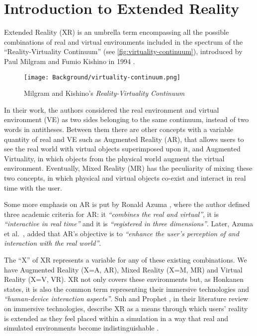\section{Introduction to Extended Reality}
\label{sec:background-intro}

Extended Reality (XR) is an umbrella term encompassing all the possible combinations of real and virtual environments included in the spectrum of the “Reality-Virtuality Continuum” (see \autoref{fig:virtuality-continuum}), introduced by Paul Milgram and Fumio Kishino in 1994 \cite{milgram_taxonomy_1994}.

\begin{figure}[h]
	\centering
	\texttt{[image: Background/virtuality-continuum.png]}
	\caption{Milgram and Kishino's \textit{Reality-Virtuality Continuum}}
	\label{fig:virtuality-continuum}
\end{figure}
In their work, the authors considered the real environment and virtual environment (VE) as two sides belonging to the same continuum, instead of two words in antitheses. Between them there are other concepts with a variable quantity of real and VE such as Augmented Reality (AR), that allows users to see the real world with virtual objects superimposed upon it, and Augmented Virtuality, in which objects from the physical world augment the virtual environment. Eventually, Mixed Reality (MR) has the peculiarity of mixing these two concepts, in which physical and virtual objects co-exist and interact in real time with the user.

Some more emphasis on AR is put by Ronald Azuma \cite{azuma1997survey}, where the author defined three academic criteria for AR: it \textit{“combines the real and virtual”}, it is \textit{“interactive in real time”} and it is \textit{“registered in three dimensions”}. Later, Azuma et al.~\cite{azuma2001recent}, added that AR's objective is to \textit{“enhance the user’s perception of and interaction with the real world”}.

The “X” of XR represents a variable for any of these existing combinations. We have Augmented Reality (X=A, AR), Mixed Reality (X=M, MR) and Virtual Reality (X=V, VR). XR not only covers these environments but, as Honkanen \cite{honkanen_enhancing_2018} states, it is also the common term representing their immersive technologies and \textit{“human-device interaction aspects”}. Suh and Prophet \cite{suh_state_2018}, in their literature review on immersive technologies, describe XR as a means through which users' reality is extended as they feel placed within a simulation in a way that real and simulated environments become indistinguishable \cite{kwok_covid-19_2020}.

